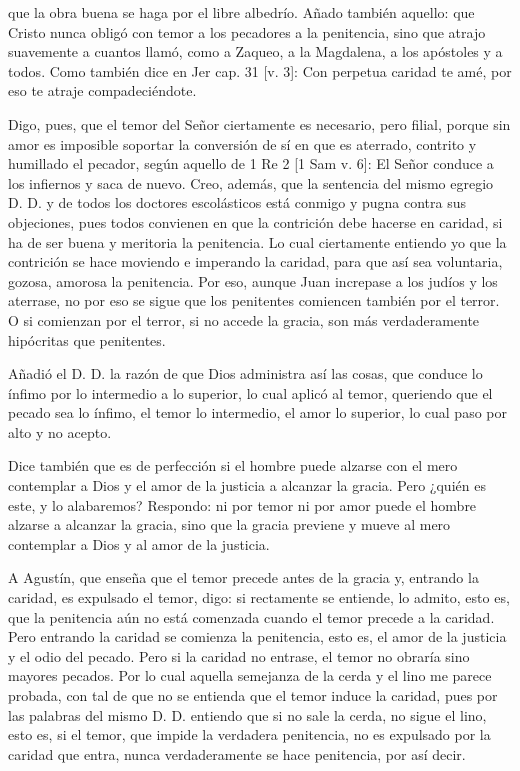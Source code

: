 que la obra buena se haga por el libre albedrío. Añado también aquello: que Cristo nunca obligó con temor a los pecadores a la penitencia, sino que atrajo suavemente a cuantos llamó, como a Zaqueo, a la Magdalena, a los apóstoles y a todos. Como también dice en Jer cap. 31 [v. 3]: Con perpetua caridad te amé, por eso te atraje compadeciéndote.

Digo, pues, que el temor del Señor ciertamente es necesario, pero filial, porque sin amor es imposible soportar la conversión de sí en que es aterrado, contrito y humillado el pecador, según aquello de 1 Re 2 [1 Sam v. 6]: El Señor conduce a los infiernos y saca de nuevo. Creo, además, que la sentencia del mismo egregio D. D. y de todos los doctores escolásticos está conmigo y pugna contra sus objeciones, pues todos convienen en que la contrición debe hacerse en caridad, si ha de ser buena y meritoria la penitencia. Lo cual ciertamente entiendo yo que la contrición se hace moviendo e imperando la caridad, para que así sea voluntaria, gozosa, amorosa la penitencia. Por eso, aunque Juan increpase a los judíos y los aterrase, no por eso se sigue que los penitentes comiencen también por el terror. O si comienzan por el terror, si no accede la gracia, son más verdaderamente hipócritas que penitentes.

Añadió el D. D. la razón de que Dios administra así las cosas, que conduce lo ínfimo por lo intermedio a lo superior, lo cual aplicó al temor, queriendo que el pecado sea lo ínfimo, el temor lo intermedio, el amor lo superior, lo cual paso por alto y no acepto.

Dice también que es de perfección si el hombre puede alzarse con el mero contemplar a Dios y el amor de la justicia a alcanzar la gracia. Pero ¿quién es este, y lo alabaremos? Respondo: ni por temor ni por amor puede el hombre alzarse a alcanzar la gracia, sino que la gracia previene y mueve al mero contemplar a Dios y al amor de la justicia.

A Agustín, que enseña que el temor precede antes de la gracia y, entrando la caridad, es expulsado el temor, digo: si rectamente se entiende, lo admito, esto es, que la penitencia aún no está comenzada cuando el temor precede a la caridad. Pero entrando la caridad se comienza la penitencia, esto es, el amor de la justicia y el odio del pecado. Pero si la caridad no entrase, el temor no obraría sino mayores pecados. Por lo cual aquella semejanza de la cerda y el lino me parece probada, con tal de que no se entienda que el temor induce la caridad, pues por las palabras del mismo D. D. entiendo que si no sale la cerda, \marginpar{\small[364]} no sigue el lino, esto es, si el temor, que impide la verdadera penitencia, no es expulsado por la caridad que entra, nunca verdaderamente se hace penitencia, por así decir.

